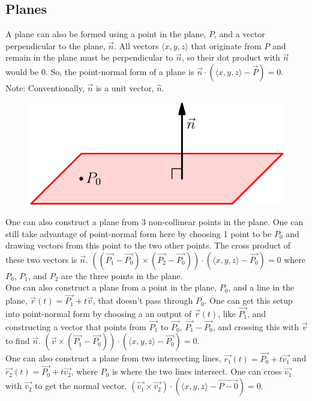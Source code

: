 \subsection{Planes}
\noindent
A plane can also be formed using a point in the plane, $P$, and a vector perpendicular to the plane, $\vec{n}$. All vectors $\langle x,y,z \rangle$ that originate from $P$ and remain in the plane must be perpendicular to $\vec{n}$, so their dot product with $\vec{n}$ would be 0. So, the point-normal form of a plane is $\vec{n}\cdot\left(\langle x,y,z \rangle - \vec{P}\right) = 0$.\\
\small{Note: Conventionally, $\vec{n}$ is a unit vector, $\hat{n}$.}

\begin{figure}[h]
	\centering
	\includegraphics[scale=0.5]{Images/vectorValuedFunctions/PlaneNormalVector}
\end{figure}

\noindent
One can also construct a plane from 3 non-collinear points in the plane. One can still take advantage of point-normal form here by choosing 1 point to be $P_0$ and drawing vectors from this point to the two other points. The cross product of these two vectors is $\vec{n}$. $\left(\left(\vec{P_1} - \vec{P_0}\right) \times \left(\vec{P_2} - \vec{P_0}\right)\right) \cdot \left(\langle x,y,z \rangle - \vec{P_0}\right) = 0$ where $P_0$, $P_1$, and $P_2$ are the three points in the plane.\\

\noindent
One can also construct a plane from a point in the plane, $P_0$, and a line in the plane, $\vec{r}(t) = \vec{P_1} + t\vec{v}$, that doesn't pass through $P_0$. One can get this setup into point-normal form by choosing a an output of $\vec{r}(t)$, like $\vec{P_1}$, and constructing a vector that points from $\vec{P_1}$ to $\vec{P_0}$, $\vec{P_1}-\vec{P_0}$, and crossing this with $\vec{v}$ to find $\vec{n}$. $\left(\vec{v} \times \left(\vec{P_1} - \vec{P_0}\right)\right) \cdot \left(\langle x,y,z \rangle - \vec{P_0}\right) = 0$.\\

\noindent
One can also construct a plane from two intersecting lines, $\vec{r_1}(t) = \vec{P_0} + t\vec{v_1}$ and $\vec{r_2}(t) = \vec{P_0} + t\vec{v_2}$, where $P_0$ is where the two lines intersect. One can cross $\vec{v_1}$ with $\vec{v_2}$ to get the normal vector.
$\left(\vec{v_1} \times \vec{v_2}\right) \cdot \left(\langle x,y,z \rangle - \vec{P-0}\right) = 0$.